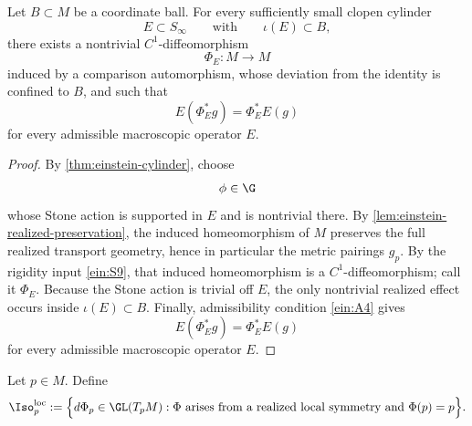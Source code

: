 \begin{theorem}
	\label{thm:einstein-local-realized}
	Let \(B\subset M\) be a coordinate ball.
	For every sufficiently small clopen cylinder
	\[
		E\subset S_\infty
		\qquad\text{with}\qquad
		\iota(E)\subset B,
	\]
	there exists a nontrivial \(C^1\)-diffeomorphism
	\[
		\Phi_E:M\to M
	\]
	induced by a comparison automorphism, whose deviation from the identity
	is confined to \(B\), and such that
	\[
		E(\Phi_E^*g)=\Phi_E^*E(g)
	\]
	for every admissible macroscopic operator \(E\).
\end{theorem}
\begin{proof}
	By \cref{thm:einstein-cylinder}, choose
	\[
		\phi\in\G
	\]
	whose Stone action is supported in \(E\) and is nontrivial there.
	By \cref{lem:einstein-realized-preservation}, the induced homeomorphism
	of \(M\) preserves the full realized transport geometry, hence in
	particular the metric pairings \(g_p\).
	By the rigidity input \ref{ein:S9}, that induced homeomorphism is a
	\(C^1\)-diffeomorphism; call it \(\Phi_E\).
	Because the Stone action is trivial off \(E\), the only nontrivial
	realized effect occurs inside \(\iota(E)\subset B\).
	Finally, admissibility condition \textup{\ref{ein:A4}} gives
	\[
		E(\Phi_E^*g)=\Phi_E^*E(g)
	\]
	for every admissible macroscopic operator \(E\).
\end{proof}
\begin{definition}
	Let \(p\in M\).
	Define
	\[
		\Iso^{\mathrm{loc}}_p
		:=
		\Bigl\{
		d\Phi_p\in \GL(T_pM):
		\Phi \text{ arises from a realized local symmetry and } \Phi(p)=p
		\Bigr\}.
	\]
\end{definition}
